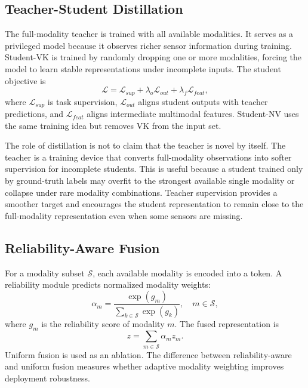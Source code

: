 \documentclass[journal, twocolumn, transmag]{IEEEtran}
\begin{document}
\subsection{Teacher-Student Distillation}
The full-modality teacher is trained with all available modalities. It serves as a privileged model because it observes richer sensor information during training. Student-VK is trained by randomly dropping one or more modalities, forcing the model to learn stable representations under incomplete inputs. The student objective is
\begin{equation}
	\mathcal{L}=\mathcal{L}_{sup}+\lambda_o\mathcal{L}_{out}+\lambda_f\mathcal{L}_{feat},
\end{equation}
where $\mathcal{L}_{sup}$ is task supervision, $\mathcal{L}_{out}$ aligns student outputs with teacher predictions, and $\mathcal{L}_{feat}$ aligns intermediate multimodal features. Student-NV uses the same training idea but removes VK from the input set.

The role of distillation is not to claim that the teacher is novel by itself. The teacher is a training device that converts full-modality observations into softer supervision for incomplete students. This is useful because a student trained only by ground-truth labels may overfit to the strongest available single modality or collapse under rare modality combinations. Teacher supervision provides a smoother target and encourages the student representation to remain close to the full-modality representation even when some sensors are missing.

\subsection{Reliability-Aware Fusion}
For a modality subset $\mathcal{S}$, each available modality is encoded into a token. A reliability module predicts normalized modality weights:
\begin{equation}
	\alpha_m=\frac{\exp(g_m)}{\sum_{k\in \mathcal{S}}\exp(g_k)}, \quad m\in\mathcal{S},
\end{equation}
where $g_m$ is the reliability score of modality $m$. The fused representation is
\begin{equation}
	z=\sum_{m\in \mathcal{S}}\alpha_m z_m.
\end{equation}
Uniform fusion is used as an ablation. The difference between reliability-aware and uniform fusion measures whether adaptive modality weighting improves deployment robustness.
\end{document}
